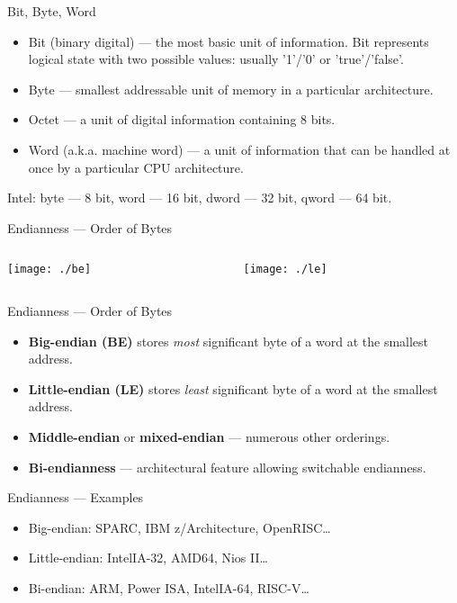 \begin{frame}{Bit, Byte, Word}
\begin{itemize}
\item Bit (binary digital) \pause --- the most basic unit of information.
  Bit represents logical state with two possible values: usually '1'/'0' or
  'true'/'false'.
\item Byte \pause --- smallest addressable unit of memory in a particular
  architecture.
\item Octet --- a unit of digital information containing 8 bits.\pause
\item Word (a.k.a. machine word) \pause --- a unit of information that can be
  handled at once by a particular CPU architecture.
\end{itemize}
\pause\vfill
Intel: byte --- 8 bit, word --- 16 bit, dword --- 32 bit, qword --- 64 bit.
\end{frame}

\begin{frame}{Endianness --- Order of Bytes}
\begin{columns}[onlytextwidth]
\begin{column}{0.5\textwidth}
\texttt{[image: ./be]}
\end{column}

\begin{column}{0.5\textwidth}
\texttt{[image: ./le]}
\end{column}
\end{columns}
\end{frame}

\begin{frame}{Endianness --- Order of Bytes}
\begin{itemize}
\item \textbf{Big-endian (BE)} stores \textit{most} significant byte of a
  word at the smallest address.
\item \textbf{Little-endian (LE)} stores \textit{least} significant byte of a
  word at the smallest address.\pause
\item \textbf{Middle-endian} or \textbf{mixed-endian} --- numerous other
  orderings.\pause
\item \textbf{Bi-endianness} --- architectural feature allowing switchable
  endianness.
\end{itemize}
\end{frame}

\begin{frame}{Endianness --- Examples}
\begin{itemize}
\item Big-endian: SPARC, IBM z/Architecture, OpenRISC\dots
\item Little-endian: Intel\reg IA-32, AMD64, Nios II\dots
\item Bi-endian: ARM, Power ISA, Intel\reg IA-64, RISC-V\dots
\end{itemize}
\end{frame}

